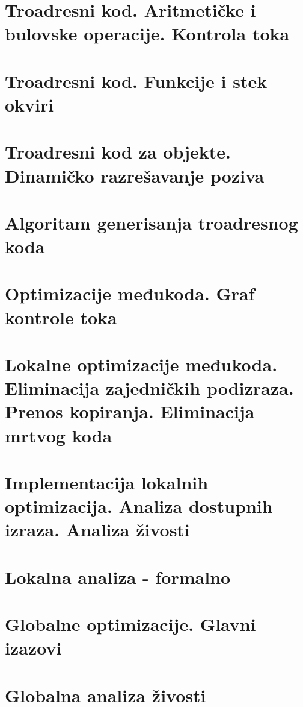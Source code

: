 \documentclass[10pt]{extarticle}
\begin{document}
\section{Troadresni kod. Aritmetičke i bulovske operacije. Kontrola toka}

\section{Troadresni kod. Funkcije i stek okviri}

\section{Troadresni kod za objekte. Dinamičko razrešavanje poziva}

\section{Algoritam generisanja troadresnog koda}

\section{Optimizacije međukoda. Graf kontrole toka}

\section{Lokalne optimizacije međukoda. Eliminacija zajedničkih podizraza. Prenos kopiranja. Eliminacija mrtvog koda}

\section{Implementacija lokalnih optimizacija. Analiza dostupnih izraza. Analiza živosti}

\section{Lokalna analiza - formalno}

\section{Globalne optimizacije. Glavni izazovi}

\section{Globalna analiza živosti}
\end{document}
